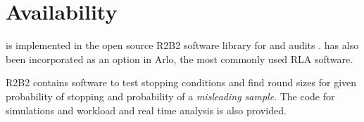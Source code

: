 \section{Availability}
\label{sec:avail}
\Providence is implemented in the open source R2B2 software library for \R and \B audits \cite{r2b2_anon}.
\Providence has also been incorporated as an option in Arlo, the most commonly used RLA software.

R2B2 contains software to test stopping conditions and find round sizes for given probability of stopping and probability of a \emph{misleading sample}. The code for simulations and workload and real time analysis is also provided.




